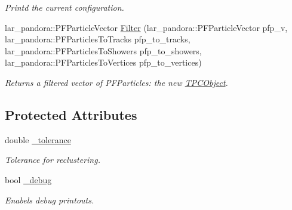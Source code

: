 \begin{DoxyCompactItemize}
\begin{DoxyCompactList}\small\item\em Printd the current configuration. \end{DoxyCompactList}\item 
\hypertarget{classubana_1_1TPCObjectFilter_ab485fca5770b8a9622d56c294b361ef3}{lar\-\_\-pandora\-::\-P\-F\-Particle\-Vector \hyperlink{classubana_1_1TPCObjectFilter_ab485fca5770b8a9622d56c294b361ef3}{Filter} (lar\-\_\-pandora\-::\-P\-F\-Particle\-Vector pfp\-\_\-v, lar\-\_\-pandora\-::\-P\-F\-Particles\-To\-Tracks pfp\-\_\-to\-\_\-tracks, lar\-\_\-pandora\-::\-P\-F\-Particles\-To\-Showers pfp\-\_\-to\-\_\-showers, lar\-\_\-pandora\-::\-P\-F\-Particles\-To\-Vertices pfp\-\_\-to\-\_\-vertices)}\label{classubana_1_1TPCObjectFilter_ab485fca5770b8a9622d56c294b361ef3}

\begin{DoxyCompactList}\small\item\em Returns a filtered vector of P\-F\-Particles\-: the new \hyperlink{classubana_1_1TPCObject}{T\-P\-C\-Object}. \end{DoxyCompactList}\end{DoxyCompactItemize}
\subsection*{Protected Attributes}
\begin{DoxyCompactItemize}
\item 
\hypertarget{classubana_1_1TPCObjectFilter_a86137c0a525fdd2b5a63afe4ff79c23c}{double \hyperlink{classubana_1_1TPCObjectFilter_a86137c0a525fdd2b5a63afe4ff79c23c}{\-\_\-tolerance}}\label{classubana_1_1TPCObjectFilter_a86137c0a525fdd2b5a63afe4ff79c23c}

\begin{DoxyCompactList}\small\item\em Tolerance for reclustering. \end{DoxyCompactList}\item 
\hypertarget{classubana_1_1TPCObjectFilter_a44156494ed6ccc98d9016c2c4306f282}{bool \hyperlink{classubana_1_1TPCObjectFilter_a44156494ed6ccc98d9016c2c4306f282}{\-\_\-debug}}\label{classubana_1_1TPCObjectFilter_a44156494ed6ccc98d9016c2c4306f282}

\begin{DoxyCompactList}\small\item\em Enabels debug printouts. \end{DoxyCompactList}\end{DoxyCompactItemize}


